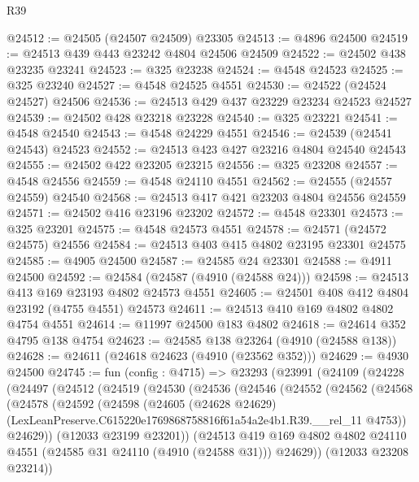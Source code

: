 \begin{lexlean}{R39}
\begin{coremodule}
@24512 := @24505 (@24507 @24509) @23305
@24513 := @4896 @24500
@24519 := @24513 @439 @443 @23242 @4804 @24506 @24509
@24522 := @24502 @438 @23235 @23241
@24523 := @325 @23238
@24524 := @4548 @24523
@24525 := @325 @23240
@24527 := @4548 @24525 @4551
@24530 := @24522 (@24524 @24527) @24506
@24536 := @24513 @429 @437 @23229 @23234 @24523 @24527
@24539 := @24502 @428 @23218 @23228
@24540 := @325 @23221
@24541 := @4548 @24540
@24543 := @4548 @24229 @4551
@24546 := @24539 (@24541 @24543) @24523
@24552 := @24513 @423 @427 @23216 @4804 @24540 @24543
@24555 := @24502 @422 @23205 @23215
@24556 := @325 @23208
@24557 := @4548 @24556
@24559 := @4548 @24110 @4551
@24562 := @24555 (@24557 @24559) @24540
@24568 := @24513 @417 @421 @23203 @4804 @24556 @24559
@24571 := @24502 @416 @23196 @23202
@24572 := @4548 @23301
@24573 := @325 @23201
@24575 := @4548 @24573 @4551
@24578 := @24571 (@24572 @24575) @24556
@24584 := @24513 @403 @415 @4802 @23195 @23301 @24575
@24585 := @4905 @24500
@24587 := @24585 @24 @23301
@24588 := @4911 @24500
@24592 := @24584 (@24587 (@4910 (@24588 @24)))
@24598 := @24513 @413 @169 @23193 @4802 @24573 @4551
@24605 := @24501 @408 @412 @4804 @23192 (@4755 @4551) @24573
@24611 := @24513 @410 @169 @4802 @4802 @4754 @4551
@24614 := @11997 @24500 @183 @4802
@24618 := @24614 @352 @4795 @138 @4754
@24623 := @24585 @138 @23264 (@4910 (@24588 @138))
@24628 := @24611 (@24618 @24623 (@4910 (@23562 @352)))
@24629 := @4930 @24500
@24745 := fun (config : @4715) =>
  @23293
    (@23991
      (@24109
        (@24228
          (@24497
            (@24512
              (@24519
                (@24530
                  (@24536
                    (@24546
                      (@24552
                        (@24562
                          (@24568
                            (@24578
                              (@24592
                                (@24598
                                  (@24605
                                    (@24628 @24629)
                                    (LexLeanPreserve.C615220e1769868758816f61a54a2e4b1.R39.__rel_11
                                      @4753))
                                  @24629))
                              (@12033 @23199 @23201))
                            (@24513
                              @419
                              @169
                              @4802
                              @4802
                              @24110
                              @4551
                              (@24585 @31 @24110 (@4910 (@24588 @31)))
                              @24629))
                          (@12033 @23208 @23214))

\end{coremodule}
\end{lexlean}
